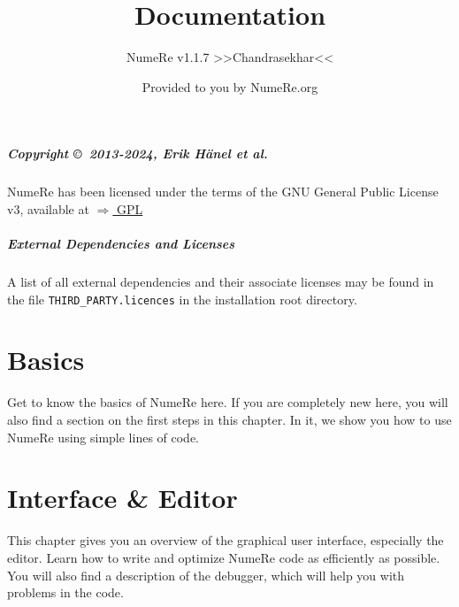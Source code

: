 \documentclass[DIV=17, parskip=half]{scrreprt}
\title{Documentation}
\subtitle{NumeRe v1.1.7 >>Chandrasekhar<<}
\date{}
\author{\small Provided to you by NumeRe.org}
\begin{document}
    \maketitle
% 
% 
	\tableofcontents
		\paragraph{Copyright \copyright\ 2013-2024, Erik H\"anel \emph{et al.}} 
		NumeRe has been licensed under the terms of the GNU General Public License v3, available at \href{http://www.gnu.org/licenses/gpl.html}{$\Rightarrow$ GPL}
		\paragraph{External Dependencies and Licenses} A list of all external dependencies and their associate licenses may be found in the file \verb!THIRD_PARTY.licences! in the installation root directory.
	\chapter{Basics}
		Get to know the basics of NumeRe here. If you are completely new here, you will also find a section on the first steps in this chapter. In it, we show you how to use NumeRe using simple lines of code.
		
		
		
		
		
		
		
		
		
		
	
	\chapter{Interface \& Editor}
		This chapter gives you an overview of the graphical user interface, especially the editor. Learn how to write and optimize NumeRe code as efficiently as possible. You will also find a description of the debugger, which will help you with problems in the code.
		
		
		
		
		
		
		
		
		
		
		
\end{document}
